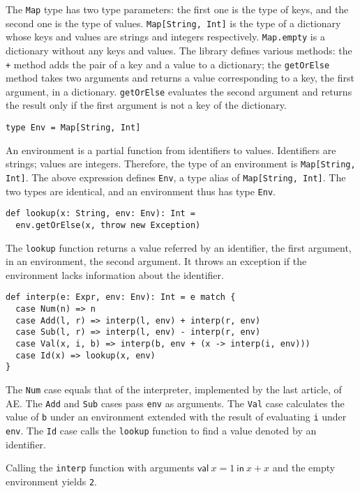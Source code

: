 The \verb!Map! type has two type parameters: the first one is the type of keys,
and the second one is the type of values. \verb!Map[String, Int]! is the type of
a dictionary whose keys and values are strings and integers respectively.
\verb!Map.empty! is a dictionary without any keys and values. The library defines
various methods: the \verb!+! method adds the pair of a key and a value to a
dictionary; the \verb!getOrElse! method takes two arguments and returns a value
corresponding to a key, the first argument, in a dictionary. \verb!getOrElse!
evaluates the second argument and returns the result only if the first argument
is not a key of the dictionary.

\begin{verbatim}
type Env = Map[String, Int]
\end{verbatim}

An environment is a partial function from identifiers to values. Identifiers are
strings; values are integers. Therefore, the type of an environment is
\verb!Map[String, Int]!. The above expression defines \verb!Env!, a type alias of
\verb!Map[String, Int]!. The two types are identical, and an environment thus has
type \verb!Env!.

\begin{verbatim}
def lookup(x: String, env: Env): Int =
  env.getOrElse(x, throw new Exception)
\end{verbatim}

The \verb!lookup! function returns a value referred by an identifier, the first
argument, in an environment, the second argument. It throws an exception if the
environment lacks information about the identifier.

\begin{verbatim}
def interp(e: Expr, env: Env): Int = e match {
  case Num(n) => n
  case Add(l, r) => interp(l, env) + interp(r, env)
  case Sub(l, r) => interp(l, env) - interp(r, env)
  case Val(x, i, b) => interp(b, env + (x -> interp(i, env)))
  case Id(x) => lookup(x, env)
}
\end{verbatim}

The \verb!Num! case equals that of the interpreter, implemented by the last
article, of AE. The \verb!Add! and \verb!Sub! cases pass \verb!env! as arguments.
The \verb!Val! case calculates the value of \verb!b! under an environment
extended with the result of evaluating \verb!i! under \verb!env!. The \verb!Id!
case calls the \verb!lookup! function to find a value denoted by an identifier.

Calling the \verb!interp! function with arguments \(\textsf{val}\ x=1\
\textsf{in}\ x+x\) and the empty environment yields \verb!2!.

